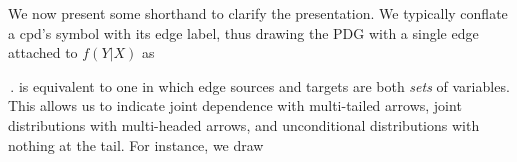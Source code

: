 \documentclass[twoside]{article}
\makeatletter
\theoremstyle{plain}
\theoremstyle{definition}
\newcommand{\dg}[1]{\mathbdcal{#1}}
\newcommand{\IDef}[1]{\mathit{IDef}_{\!#1}}
\newcommand\aar{\@ifstar\aar@one@star\aar@plain}
\newcommand\aar@one@star{\@ifstar\aar@resize{\aar@plain*}}
\newcommand\aar@resize[1]{\sbox{\aar@content}{#1}\scaleleftright[3.8ex]
			{\Biggl\langle\!\!\!\!\Biggl\langle}{\usebox{\aar@content}}
			{\Biggr\rangle\!\!\!\!\Biggr\rangle}}
\makeatother
\begin{document}



We now present some shorthand to clarify the presentation.
We typically conflate a cpd's symbol with its edge label,
thus drawing
the PDG with a single edge attached to $f(Y|X)$ as
\,.
 is equivalent to one in which edge sources and targets are both \emph{sets} of variables.
This allows us to indicate joint dependence with multi-tailed arrows, joint distributions with multi-headed arrows,
and unconditional distributions with nothing at the tail.
For instance, we draw
%
\\[-0.5ex]
\phantom{aa}
\end{document}
